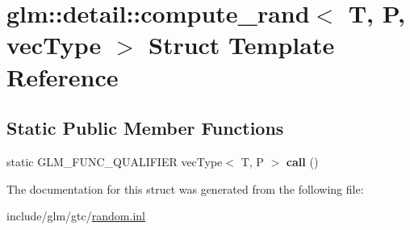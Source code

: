 \hypertarget{structglm_1_1detail_1_1compute__rand}{}\section{glm\+:\+:detail\+:\+:compute\+\_\+rand$<$ T, P, vec\+Type $>$ Struct Template Reference}
\label{structglm_1_1detail_1_1compute__rand}
\subsection*{Static Public Member Functions}
\begin{DoxyCompactItemize}
\item 
\mbox{\label{structglm_1_1detail_1_1compute__rand_ab66bca4a567d6f4aa01031d669d270d3}} 
static G\+L\+M\+\_\+\+F\+U\+N\+C\+\_\+\+Q\+U\+A\+L\+I\+F\+I\+ER vec\+Type$<$ T, P $>$ {\bfseries call} ()
\end{DoxyCompactItemize}


The documentation for this struct was generated from the following file\+:\begin{DoxyCompactItemize}
\item 
include/glm/gtc/\hyperlink{random_8inl}{random.\+inl}\end{DoxyCompactItemize}
